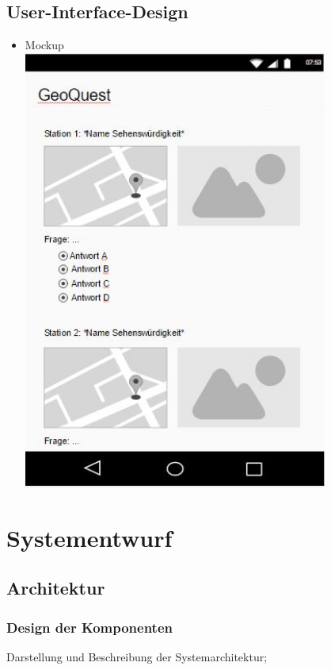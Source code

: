 \section{User-Interface-Design}
\begin{itemize}
	\item Mockup\\
	\includegraphics[width=10cm]{mockup}\\
	
\end{itemize}


\chapter{Systementwurf}

\section{Architektur}

\subsection{Design der Komponenten}

Darstellung und Beschreibung der Systemarchitektur;

